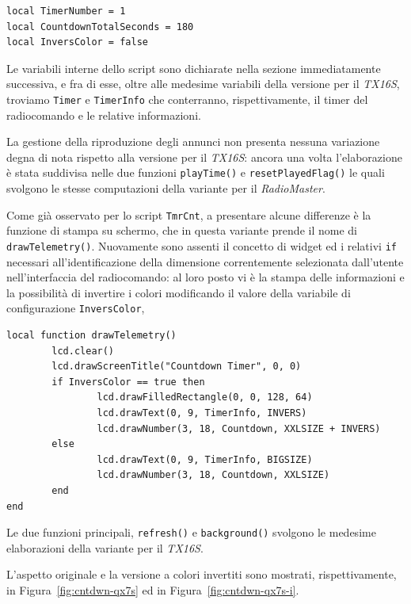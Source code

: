 \documentclass[a4paper, 12pt]{report} %
\begin{document}
\begin{lstlisting}
local TimerNumber = 1
local CountdownTotalSeconds = 180
local InversColor = false
\end{lstlisting}

Le variabili interne dello script sono dichiarate nella sezione immediatamente successiva, e fra di esse, oltre alle medesime variabili della versione per il \emph{TX16S}, troviamo \texttt{Timer} e \texttt{TimerInfo} che conterranno, rispettivamente, il timer del radiocomando e le relative informazioni.

La gestione della riproduzione degli annunci non presenta nessuna variazione degna di nota rispetto alla versione per il \emph{TX16S}: ancora una volta l'elaborazione è stata suddivisa nelle due funzioni \texttt{playTime()} e \texttt{resetPlayedFlag()} le quali svolgono le stesse computazioni della variante per il \emph{RadioMaster}.

Come già osservato per lo script \texttt{TmrCnt}, a presentare alcune differenze è la funzione di stampa su schermo, che in questa variante prende il nome di \texttt{drawTelemetry()}. Nuovamente sono assenti il concetto di widget ed i relativi \texttt{if} necessari all'identificazione della dimensione correntemente selezionata dall'utente nell'interfaccia del radiocomando: al loro posto vi è la stampa delle informazioni e la possibilità di invertire i colori modificando il valore della variabile di configurazione \texttt{InversColor},

\begin{lstlisting}
local function drawTelemetry()
        lcd.clear() 
        lcd.drawScreenTitle("Countdown Timer", 0, 0)
        if InversColor == true then
                lcd.drawFilledRectangle(0, 0, 128, 64)
                lcd.drawText(0, 9, TimerInfo, INVERS)
                lcd.drawNumber(3, 18, Countdown, XXLSIZE + INVERS)
        else
                lcd.drawText(0, 9, TimerInfo, BIGSIZE)
                lcd.drawNumber(3, 18, Countdown, XXLSIZE)
        end
end
\end{lstlisting}

Le due funzioni principali, \texttt{refresh()} e \texttt{background()} svolgono le medesime elaborazioni della variante per il \emph{TX16S}.

L'aspetto originale e la versione a colori invertiti sono mostrati, rispettivamente, in Figura~\ref{fig:cntdwn-qx7s} ed in Figura~\ref{fig:cntdwn-qx7s-i}.
\end{document}
